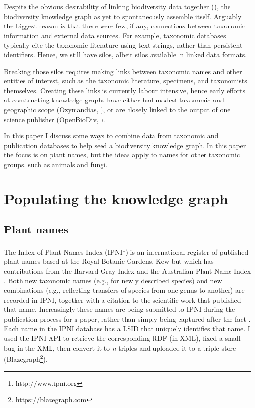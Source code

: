 \documentclass[runningheads]{llncs}
\begin{document}
Despite the obvious desirability of linking biodiversity data together (\cite{bik_lets_2017}), the biodiversity knowledge graph as yet to spontaneously assemble itself. Arguably the biggest reason is that there were few, if any, connections between taxonomic information and external data sources. For example, taxonomic databases typically cite the taxonomic literature using text strings, rather than persistent identifiers. Hence, we still have silos, albeit silos available in linked data formats.

Breaking those silos requires making links between taxonomic names and other entities of interest, such as the taxonomic literature, specimens, and taxonomists themselves. Creating these links is currently labour intensive, hence early efforts at constructing knowledge graphs have either had modest taxonomic and geographic scope (Ozymandias, \cite{page_ozymandias:_2019}), or are closely linked to the output of one science publisher (OpenBioDiv, \cite{penev_openbiodiv:_2019}).

In this paper I discuss some ways to combine data from taxonomic and publication databases to help seed a biodiversity knowledge graph. In this paper the focus is on plant names, but the ideas apply to names for other taxonomic groups, such as animals and fungi.

\section{Populating the knowledge graph}
\subsection{Plant names}

The Index of Plant Names Index (IPNI\footnote{http://www.ipni.org}) is an international register of published plant names based at the Royal Botanic Gardens, Kew but which has contributions from the Harvard Gray Index and the Australian Plant Name Index \cite{croft_plant_1999}. Both new taxonomic names (e.g., for newly described species) and new combinations (e.g., reflecting transfers of species from one genus to another) are recorded in IPNI, together with a citation to the scientific work that published that name. Increasingly these names are being submitted to IPNI during the publication process for a paper, rather than simply being captured after the fact \cite{penev_common_2016}. Each name in the IPNI database has a LSID that uniquely identifies that name. I used the IPNI API to retrieve the corresponding RDF (in XML), fixed a small bug in the XML, then convert it to \textit{n}-triples and uploaded it to a triple store (Blazegraph\footnote{https://blazegraph.com}).
\end{document}
